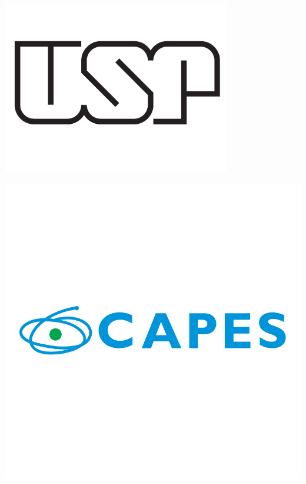 \documentclass[a0,portrait]{a0poster}
\begin{document}
\begin{minipage}[b]{0.3\linewidth}
\includegraphics[width=10cm]{usplogo.pdf}\\
\end{minipage}


%
\begin{minipage}[b]{0.7\linewidth}
\includegraphics[width=20cm]{logohorizontalcapes.jpg}\\
\end{minipage}
\end{document}
